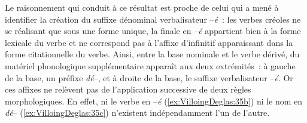 \documentclass[output=paper]{langsci/langscibook}
\begin{document}
Le raisonnement qui conduit à ce résultat est proche de celui qui a mené
à identifier la création du suffixe dénominal verbalisateur --\emph{é}~:
les verbes créoles ne se réalisant que sous une forme unique, la finale
en --\emph{é} appartient bien à la forme lexicale du verbe et ne
correspond pas à l'affixe d'infinitif apparaissant dans la forme
citationnelle du verbe. Ainsi, entre la base nominale et le verbe
dérivé, du matériel phonologique supplémentaire apparaît aux deux
extrémités~: à gauche de la base, un préfixe \emph{dé}--, et à droite de
la base, le suffixe verbalisateur --\emph{é}. Or ces affixes ne relèvent
pas de l'application successive de deux règles morphologiques. En effet,
ni le verbe en --\emph{é} (\ref{ex:VilloingDeglas:35b}) ni le nom en \emph{dé}-- (\ref{ex:VilloingDeglas:35c}) n'existent
indépendamment l'un de l'autre.


\ea \label{ex:VilloingDeglas:35b}
      \z
\ex \label{ex:VilloingDeglas:35c}
\z\z
\end{document}
